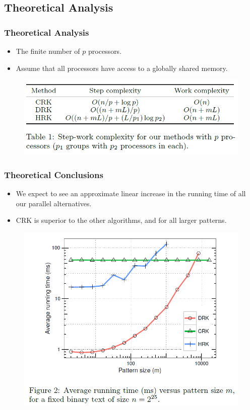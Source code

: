 \subsection{Theoretical Analysis}
\begin{frame}
	\frametitle{Theoretical Analysis}
	\begin{itemize}
		\setlength\itemsep{1em}
		\item The finite number of $p$ processors.
		\item Assume that all processors have access to a globally 
		shared memory.
	\end{itemize}
	\begin{figure}
		\includegraphics[scale=0.40]{figure/fig-complexity.png}
	\end{figure}
\end{frame}

\begin{frame}
	\frametitle{Theoretical Conclusions}
	\begin{itemize}
		\item We expect to see an approximate linear increase in the running time of all our parallel alternatives.
		\item CRK is superior to the other algorithms, and for all
		larger patterns.
	\end{itemize}
	\begin{figure}
		\includegraphics[scale=0.25]{figure/fig-result.png}
	\end{figure}
\end{frame}